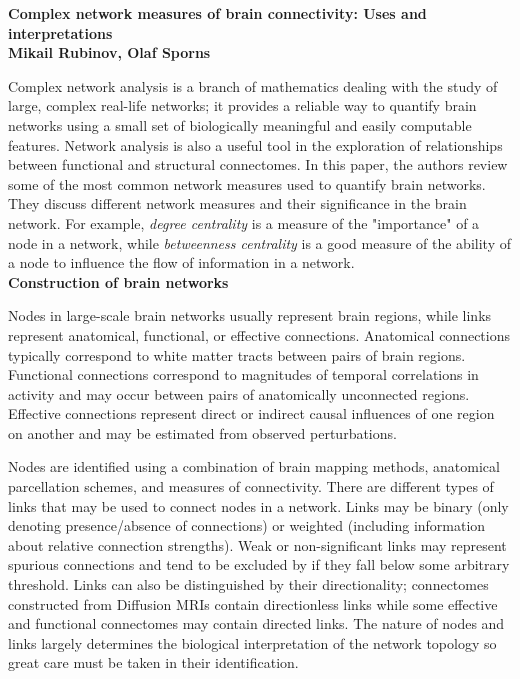 \documentclass[11pt, letterpaper]{article}
\begin{document}
\begin{center}
    \large\textbf{Complex network measures of brain connectivity: Uses and interpretations\\
                  Mikail Rubinov, Olaf Sporns}
\end{center}

Complex network analysis is a branch of mathematics dealing with the study of large, complex real-life networks; 
it provides a reliable way to quantify brain networks using a small set of biologically meaningful and easily 
computable features. Network analysis is also a useful tool in the exploration of relationships between functional 
and structural connectomes. In this paper, the authors review some of the most common network measures used to 
quantify brain networks. They discuss different network measures and their significance in the brain network. 
For example, \textit{degree centrality} is a measure of the "importance" of a node in a network, while 
\textit{betweenness centrality} is a good measure of the ability of a node to influence the flow of information 
in a network.\\


\noindent\textbf{Construction of brain networks}

\indent Nodes in large-scale brain networks usually represent brain regions, while links represent anatomical, 
functional, or effective connections. Anatomical connections typically correspond to white matter tracts between 
pairs of brain regions. Functional connections correspond to magnitudes of temporal correlations in activity and 
may occur between pairs of anatomically unconnected regions. Effective connections represent direct or indirect 
causal influences of one region on another and may be estimated from observed perturbations.

Nodes are identified using a combination of brain mapping methods, anatomical parcellation schemes, and measures 
of connectivity. There are different types of links that may be used to connect nodes in a network. Links may be 
binary (only denoting presence/absence of connections) or weighted (including information about relative connection 
strengths). Weak or non-significant links may represent spurious connections and tend to be excluded by if they fall 
below some arbitrary threshold. Links can also be distinguished by their directionality; connectomes constructed 
from Diffusion MRIs contain directionless links while some effective and functional connectomes may contain directed 
links. The nature of nodes and links largely determines the biological interpretation of the network topology so great 
care must be taken in their identification.\\
\end{document}
